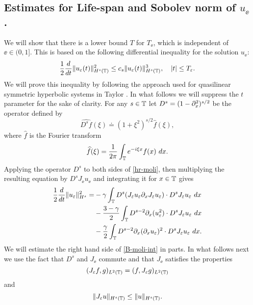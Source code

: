 \subsection{ Estimates  for Life-span and Sobolev norm of $u_\ee$.}
%
We will show that there is a lower bound  $T$
for $T_\ee$, which is  independent of $\ee\in(0, 1]$.
This is based on the following differential
inequality for the solution $u_\ee$:
%
\begin{equation} 
	\label{B-diff-ineq}
	\frac 12
	\frac{d}{dt}
	\|u_\varepsilon(t)\|_{H^{s}(\mathbb{T})}^2
	\le
	c_s
	\|u_\varepsilon(t)\|_{H^{s}(\mathbb{T})}^3,
	\quad
	|t| \le T_\varepsilon.
\end{equation}
%
%
We will prove this inequality  by
following the approach used for quasilinear symmetric
hyperbolic systems in Taylor \cite{Taylor_1991_Pseudodifferent}. In what follows we will suppress the
$t$ parameter for the sake of clarity.
%
For any $s\in \mathbb{T}$ let   $D^s=(1-\partial_x^2)^{s/2}$ be the  operator
defined by 
%
$$ \widehat{D^s f}(\xi) \doteq (1 + \xi^2)^{s/2} \widehat{f}(\xi), $$
%
where $ \widehat{f}$ is the Fourier transform
%
$$ \widehat{f}(\xi) =  \frac{1}{2\pi}\int_{\mathbb{T}} e^{-i \xi x} f(x) \ dx.  $$
%
Applying the operator $D^s$ to  both sides of  \eqref{hr-moli},
then  multiplying the resulting equation by $D^s J_\ee u_\ee$
and integrating it for $x\in\mathbb{T}$ gives
%
\begin{equation} 
	\begin{split}
		\label{B-moli-int}
		\frac 12
		\frac{d}{dt} \|u_\varepsilon \|_{H^s}^2
		=
		&-
		\gamma \int_{\mathbb{T}}  D^s(J_\varepsilon u_\varepsilon \partial_x J_\varepsilon u_\varepsilon) \cdot
		D^s J_\varepsilon u_\varepsilon  \  dx
		\\
		&- \frac{3 -\gamma}{2} \int_{\mathbb{T}} D^{s-2} \partial_x (u_{\varepsilon}^2) 
		\cdot D^s J_\varepsilon u_{\varepsilon} \ dx
		\\
		&- \frac{\gamma}{2} \int_{\mathbb{T}}  D^{s-2} \partial_x (\partial_x u_\varepsilon)^2
		\cdot D^s J_\varepsilon u_\varepsilon  \ dx.
	\end{split}
\end{equation}
%
We will estimate the right hand side of \eqref{B-moli-int} in parts. In
what follows next we use the fact that  $D^s$ and $J_\ee$ commute and
that  $J_\ee$ satisfies the properties 
%
\begin{equation} 
	\label{J-e-inner-prod-property}
	(J_\varepsilon f, g)_{L^2(\mathbb{T})}=( f, J_\varepsilon g)_{L^2(\mathbb{T})}
\end{equation}
%
and
%
\begin{equation} 
	\label{Je-u-Hs}
	\| J_\varepsilon u \|_{H^s(\mathbb{T})}
	\le
	\|  u \|_{H^s(\mathbb{T})}.
\end{equation}
%
